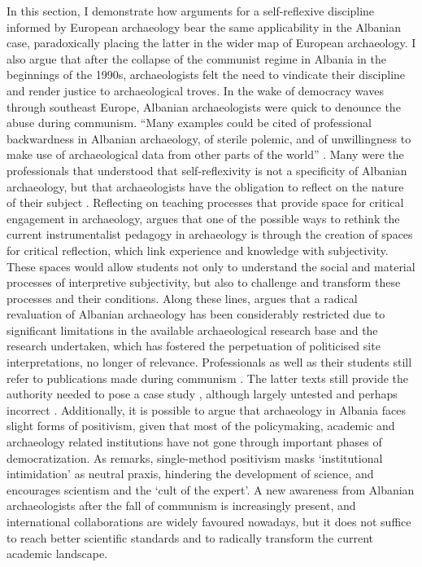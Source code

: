 	In this section, I demonstrate how arguments for a self-reflexive discipline informed by European archaeology bear the same applicability in the Albanian case, paradoxically placing the latter in the wider map of European archaeology. I also argue that after the collapse of the communist regime in Albania in the beginnings of the 1990s, archaeologists felt the need to vindicate their discipline and render justice to archaeological troves.
	In the wake of democracy waves through southeast Europe, Albanian archaeologists were quick to denounce the abuse during communism. ``Many examples could be cited of professional backwardness in Albanian archaeology, of sterile polemic, and of unwillingness to make use of archaeological data from other parts of the world'' \parencite{Miraj1993}. Many were the professionals that understood that self-reflexivity is not a specificity of Albanian archaeology, but that archaeologists have the obligation to reflect on the nature of their subject \parencite[60]{Gramsch2011}.
	Reflecting on teaching processes that provide space for critical engagement in archaeology, \textcite[287]{Hamilakis2004} argues that one of the possible ways to rethink the current instrumentalist pedagogy in archaeology is through the creation of spaces for critical reflection, which link experience and knowledge with subjectivity. These spaces would allow students not only to understand the social and material processes of interpretive subjectivity, but also to challenge and transform these processes and their conditions.
	Along these lines, \textcite[371]{Martin2006} argues that a radical revaluation of Albanian archaeology has been considerably restricted due to significant limitations in the available archaeological research base and the research undertaken, which has fostered the perpetuation of politicised site interpretations, no longer of relevance. Professionals as well as their students still refer to publications made during communism \parencite{Hodges2004}. The latter texts still provide the authority needed to pose a case study \parencite[8–9]{Bintliff2011}, although largely untested and perhaps incorrect \parencite[11]{Galaty2006}. Additionally, it is possible to argue that archaeology in Albania faces slight forms of positivism, given that most of the policymaking, academic and archaeology related institutions have not gone through important phases of democratization. As \textcite[45]{Johnson2010} remarks, single-method positivism masks `institutional intimidation' as neutral praxis, hindering the development of science, and encourages scientism and the `cult of the expert'.
	A new awareness from Albanian archaeologists after the fall of communism is increasingly present, and international collaborations are widely favoured nowadays, but it does not suffice to reach better scientific standards and to radically transform the current academic landscape.
				
